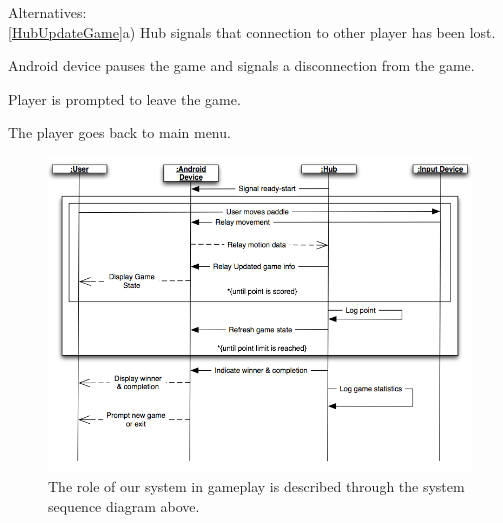\documentclass[12pt]{article}
\newenvironment{enumerate*}%
  {\begin{enumerate}%
  	\setlength{\parsep}{0pt}
    \setlength{\itemsep}{0pt}%
    \setlength{\parskip}{0pt}}%
  {\end{enumerate}}
\begin{document}
Alternatives:\\
\ref{HubUpdateGame}a) Hub signals that connection to other player has 
  been lost.
\begin{enumerate*}
\item Android device pauses the game and signals a disconnection from the game.
\item Player is prompted to leave the game.
\item The player goes back to main menu.
\end{enumerate*}

\begin{figure}
\begin{center}
\includegraphics[scale=.5]{SystemSeq.png}
\caption{\label{System Sequence Diagram}The role of our system in gameplay is 
  described through the system sequence diagram above.}
\end{center}
\end{figure}
\end{document}
